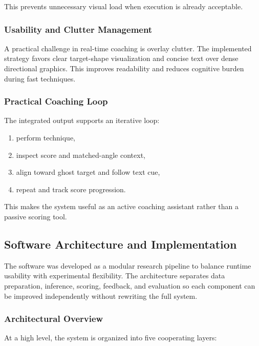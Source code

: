 \documentclass[12pt]{article}
\begin{document}
{This prevents unnecessary visual load when execution is already acceptable.

\subsubsection{Usability and Clutter Management}

A practical challenge in real-time coaching is overlay clutter. The implemented strategy favors clear target-shape visualization and concise text over dense directional graphics. This improves readability and reduces cognitive burden during fast techniques.

\subsubsection{Practical Coaching Loop}

The integrated output supports an iterative loop:

\begin{enumerate}
    \item perform technique,
    \item inspect score and matched-angle context,
    \item align toward ghost target and follow text cue,
    \item repeat and track score progression.
\end{enumerate}

This makes the system useful as an active coaching assistant rather than a passive scoring tool.

\subsection{Software Architecture and Implementation}

The software was developed as a modular research pipeline to balance runtime usability with experimental flexibility. The architecture separates data preparation, inference, scoring, feedback, and evaluation so each component can be improved independently without rewriting the full system.

\subsubsection{Architectural Overview}

At a high level, the system is organized into five cooperating layers:

}
\end{document}

